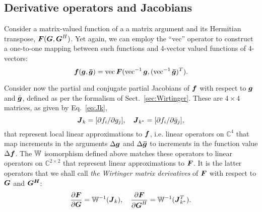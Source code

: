 \documentclass[useAMS,usenatbib]{mn2e}
\makeatletter
\newcommand{\COMPLEX}{\mathbb{C}}
\newcommand{\mat}[1]{{\bmath{#1}}}
\newcommand{\JJ}{\mat{J}} %
\newcommand{\Matrix}[2]{\left [ \begin{array}{@{}#1@{}}#2\end{array} \right ]}
\numberwithin{equation}{section}
\makeatother
\begin{document}

\subsection{Derivative operators and Jacobians}

Consider a matrix-valued function of a a matrix argument and its Hermitian transpose,
$\mat{F}(\mat{G},\mat{G}^H)$. Yet again, we can employ the ``vec'' operator to construct a one-to-one
mapping between such functions and 4-vector valued functions of 4-vectors:
\begin{equation}
\bmath{f}(\bmath{g},\bmath{\bar{g}}) = \VEC{\mat{F}(\VECINV{\bmath{g}},(\VECINV{\bmath{\bar{g}}})^T)}.
\end{equation}

Consider now the partial and conjugate partial Jacobians of $\bmath{f}$ with respect to $\bmath{g}$ 
and $\bar{\bmath{g}}$, defined as per the formalism of Sect.~\ref{sec:Wirtinger}.  
These are $4\times4$ matrices, as given by Eq.~\ref{eq:Jk},
\begin{equation}
\label{eq:Jk-fg}
\JJ_k = [ \partial f_i / \partial g_j ],~~~\JJ_{k^*} = [ \partial f_i / \partial \bar{g}_j ],
\end{equation}
that represent local linear approximations to $\bmath{f}$, i.e. linear operators on $\COMPLEX^4$ that
map increments in the arguments $\Delta\bmath{g}$ and $\Delta\bmath{\bar{g}}$ to increments 
in the function value $\Delta\bmath{f}$. The $\mathbb{W}$ isomorphism defined above matches these operators
to linear operators on $\COMPLEX^{2\times2}$ that represent linear approximations to 
$\bmath{F}$. It is the latter operators that we shall call \emph{the Wirtinger matrix derivatives}
of $\mat{F}$ with respect to $\mat{G}$ and $\mat{G^H}$:
\begin{equation}
\label{eq:def:dF:dG}
\frac{\partial\mat{F}}{\partial{\mat{G}}} = \WWi(\JJ_k),~~~
\frac{\partial\mat{F}}{\partial{\mat{G}^H}} = \WWi(\JJ_{k^*}^T).
\end{equation}
\end{document}
